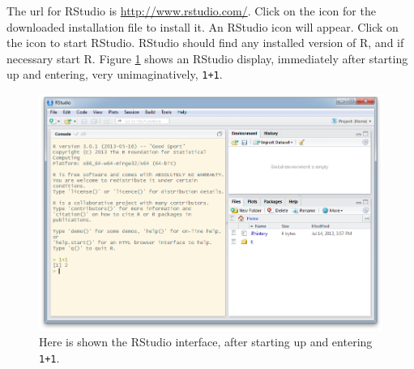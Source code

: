 \documentclass{tufte-book}\usepackage[]{graphicx}\usepackage[]{color}
\newcommand{\txtt}[1]{\texttt{#1}}
\begin{document}




The url for RStudio is \url{http://www.rstudio.com/}.  Click on the
icon for the downloaded installation file to install it. An RStudio
icon will appear.  Click on the icon to start RStudio.  RStudio should
find any installed version of R, and if necessary start R.  Figure
\ref{fig:rstudio} shows an RStudio display, immediately after starting
up and entering, very unimaginatively, \txtt{1+1}.

\begin{figure}
\includegraphics{figs-inc/03i-all4.png}
\caption{Here is shown the RStudio interface, after starting up and
  entering \txtt{1+1}.}\label{fig:rstudio}
\end{figure}
\pagebreak
\end{document}
